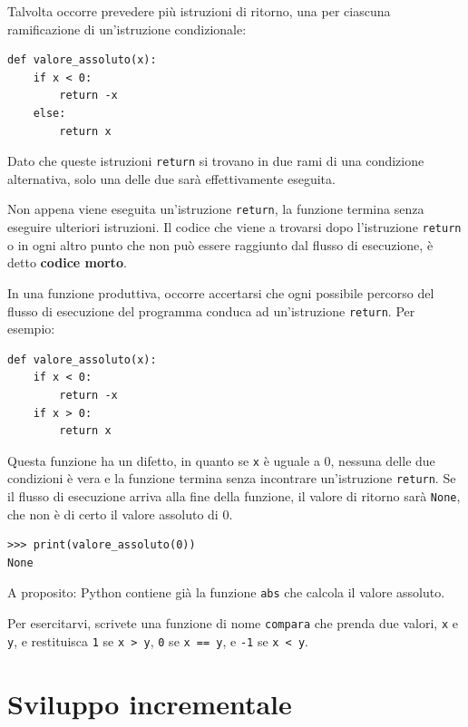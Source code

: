 \documentclass[10pt]{book}
\begin{document}
Talvolta occorre prevedere più istruzioni di ritorno, una per ciascuna ramificazione di un'istruzione condizionale:

\begin{verbatim}
def valore_assoluto(x):
    if x < 0:
        return -x
    else:
        return x
\end{verbatim}
%
Dato che queste istruzioni {\tt return} si trovano in due rami di una
condizione alternativa, solo una delle due sarà effettivamente eseguita.

Non appena viene eseguita un'istruzione {\tt return}, la funzione termina senza eseguire ulteriori istruzioni. Il codice che viene a trovarsi dopo l'istruzione {\tt return} o in ogni altro punto che non può essere raggiunto dal flusso di esecuzione, è detto {\bf codice morto}.

In una funzione produttiva, occorre accertarsi che ogni possibile percorso del flusso di esecuzione del programma conduca ad un'istruzione {\tt return}. Per esempio:

\begin{verbatim}
def valore_assoluto(x):
    if x < 0:
        return -x
    if x > 0:
        return x
\end{verbatim}
%
Questa funzione ha un difetto, in quanto se {\tt x} è uguale a 0, nessuna delle due condizioni è vera e la funzione termina senza incontrare un'istruzione {\tt return}. Se il flusso di esecuzione arriva alla fine della funzione, il valore di ritorno sarà {\tt None}, che non è di certo il valore assoluto di 0.

\begin{verbatim}
>>> print(valore_assoluto(0))
None
\end{verbatim}
%
A proposito: Python contiene già la funzione {\tt abs} che calcola il valore assoluto.

Per esercitarvi, scrivete una funzione di nome {\tt compara} che prenda due valori, {\tt x} e {\tt y}, e restituisca
 {\tt 1} se {\tt x > y}, {\tt 0} se {\tt x == y}, e {\tt -1} se {\tt x < y}.


\section{Sviluppo incrementale}
\label{incremental.development}
\end{document}
